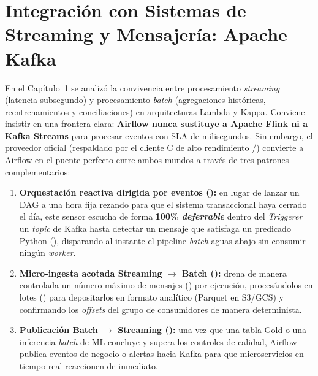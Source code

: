 \section{Integración con Sistemas de Streaming y Mensajería: Apache Kafka}\label{sec:conectores-kafka}

En el Capítulo~1 se analizó la convivencia entre procesamiento \textit{streaming} (latencia subsegundo) y procesamiento \textit{batch} (agregaciones históricas, reentrenamientos y conciliaciones) en arquitecturas Lambda y Kappa. Conviene insistir en una frontera clara: \textbf{Airflow nunca sustituye a Apache Flink ni a Kafka Streams} para procesar eventos con SLA de milisegundos. Sin embargo, el proveedor oficial  (respaldado por el cliente C de alto rendimiento /) convierte a Airflow en el puente perfecto entre ambos mundos a través de tres patrones complementarios:

\begin{enumerate}
  \item \textbf{Orquestación reactiva dirigida por eventos ():} en lugar de lanzar un DAG a una hora fija rezando para que el sistema transaccional haya cerrado el día, este sensor escucha de forma \textbf{100\% \textit{deferrable}} dentro del \textit{Triggerer} un \textit{topic} de Kafka hasta detectar un mensaje que satisfaga un predicado Python (), disparando al instante el pipeline \textit{batch} aguas abajo sin consumir ningún \textit{worker}.
  \item \textbf{Micro-ingesta acotada Streaming $\rightarrow$ Batch ():} drena de manera controlada un número máximo de mensajes () por ejecución, procesándolos en lotes () para depositarlos en formato analítico (Parquet en S3/GCS) y confirmando los \textit{offsets} del grupo de consumidores de manera determinista.
  \item \textbf{Publicación Batch $\rightarrow$ Streaming ():} una vez que una tabla Gold o una inferencia \textit{batch} de ML concluye y supera los controles de calidad, Airflow publica eventos de negocio o alertas hacia Kafka para que microservicios en tiempo real reaccionen de inmediato.
\end{enumerate}


